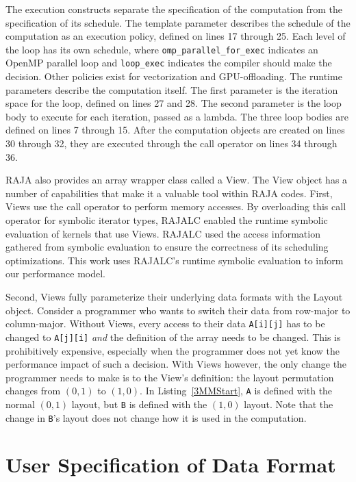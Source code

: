 \documentclass[sigconf,review=true]{acmart}
\begin{document}
The execution constructs separate the specification of the computation from the specification of its schedule.
The template parameter describes the schedule of the computation as an execution policy, defined on lines 17 through 25.
Each level of the loop has its own schedule, where \verb.omp_parallel_for_exec. indicates an OpenMP parallel loop and \verb.loop_exec. indicates the compiler should make the decision.
Other policies exist for vectorization and GPU-offloading.
The runtime parameters describe the computation itself. 
The first parameter is the iteration space for the loop, defined on lines 27 and 28. 
The second parameter is the loop body to execute for each iteration, passed as a lambda.
The three loop bodies are defined on lines 7 through 15.
After the computation objects are created on lines 30 through 32, they are executed through the call operator on lines 34 through 36.

RAJA also provides an array wrapper class called a View.
The View object has a number of capabilities that make it a valuable tool within RAJA codes.
First, Views use the call operator to perform memory accesses. 
By overloading this call operator for symbolic iterator types, RAJALC enabled the runtime symbolic evaluation of kernels that use Views.
RAJALC used the access information gathered from symbolic evaluation to ensure the correctness of its scheduling optimizations.
This work uses RAJALC's runtime symbolic evaluation to inform our performance model.

Second, Views fully parameterize their underlying data formats with the Layout object.
Consider a programmer who wants to switch their data from row-major to column-major. 
Without Views, every access to their data \verb.A[i][j]. has to be changed to \verb.A[j][i]. \textit{and} the definition of the array needs to be changed. 
This is prohibitively expensive, especially when the programmer does not yet know the performance impact of such a decision.
With Views however, the only change the programmer needs to make is to the View's definition: the layout permutation changes from $(0,1)$ to $(1,0)$. 
In Listing~\ref{3MMStart}, \verb.A. is defined with the normal $(0,1)$ layout, but \verb.B. is defined with the $(1,0)$ layout. 
Note that the change in \verb.B.'s layout does not change how it is used in the computation. 




\section{User Specification of Data Format}
\end{document}
